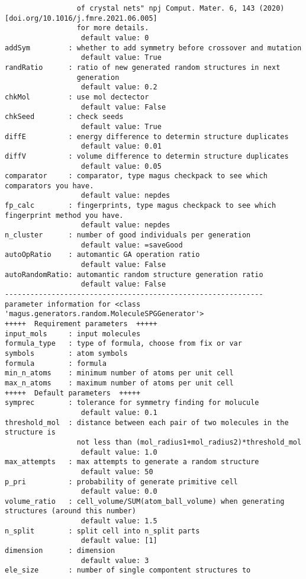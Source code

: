 \documentclass[12pt,oneside]{book}
\begin{document}
\begin{tcolorbox}
\begin{verbatim}
                 of crystal nets" npj Comput. Mater. 6, 143 (2020) [doi.org/10.1016/j.fmre.2021.06.005]
                 for more details.
                  default value: 0
addSym         : whether to add symmetry before crossover and mutation
                  default value: True
randRatio      : ratio of new generated random structures in next
                 generation
                  default value: 0.2
chkMol         : use mol dectector
                  default value: False
chkSeed        : check seeds
                  default value: True
diffE          : energy difference to determin structure duplicates
                  default value: 0.01
diffV          : volume difference to determin structure duplicates
                  default value: 0.05
comparator     : comparator, type magus checkpack to see which comparators you have.
                  default value: nepdes
fp_calc        : fingerprints, type magus checkpack to see which fingerprint method you have.
                  default value: nepdes
n_cluster      : number of good individuals per generation
                  default value: =saveGood
autoOpRatio    : automantic GA operation ratio
                  default value: False
autoRandomRatio: automantic random structure generation ratio
                  default value: False
-------------------------------------------------------------
parameter information for <class 'magus.generators.random.MoleculeSPGGenerator'>
+++++  Requirement parameters  +++++
input_mols     : input molecules
formula_type   : type of formula, choose from fix or var
symbols        : atom symbols
formula        : formula
min_n_atoms    : minimum number of atoms per unit cell
max_n_atoms    : maximum number of atoms per unit cell
+++++  Default parameters  +++++
symprec        : tolerance for symmetry finding for molucule
                  default value: 0.1
threshold_mol  : distance between each pair of two molecules in the structure is 
                 not less than (mol_radius1+mol_radius2)*threshold_mol
                  default value: 1.0
max_attempts   : max attempts to generate a random structure
                  default value: 50
p_pri          : probability of generate primitive cell
                  default value: 0.0
volume_ratio   : cell_volume/SUM(atom_ball_volume) when generating structures (around this number)
                  default value: 1.5
n_split        : split cell into n_split parts
                  default value: [1]
dimension      : dimension
                  default value: 3
ele_size       : number of single compontent structures to

\end{verbatim}
\end{tcolorbox}
\end{document}
